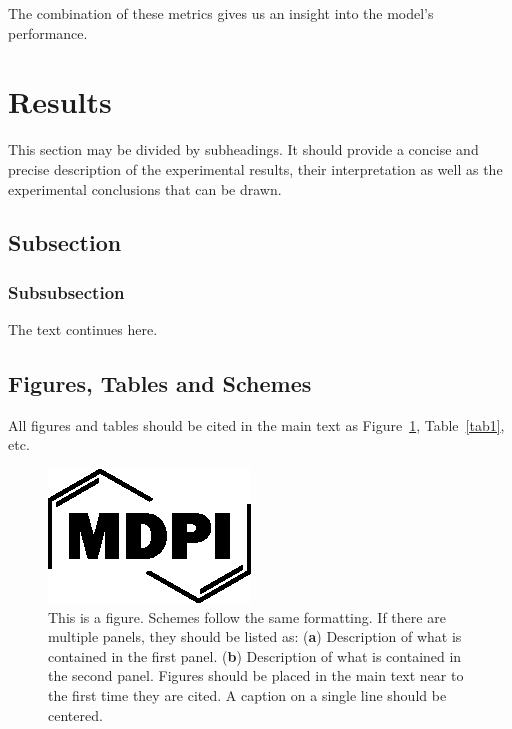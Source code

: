 \documentclass[futureinternet,article,submit,pdftex,moreauthors]{Definitions/mdpi}
\begin{document}
The combination of these metrics gives us an insight into the model's performance. 

\section{Results}

This section may be divided by subheadings. It should provide a concise and precise description of the experimental results, their interpretation as well as the experimental conclusions that can be drawn.
\subsection{Subsection}
\subsubsection{Subsubsection}


The text continues here. 

\subsection{Figures, Tables and Schemes}

All figures and tables should be cited in the main text as Figure~\ref{fig1}, Table~\ref{tab1}, etc.

\begin{figure}[H]
\includegraphics[width=10.5 cm]{Definitions/logo-mdpi}
\caption{This is a figure. Schemes follow the same formatting. If there are multiple panels, they should be listed as: (\textbf{a}) Description of what is contained in the first panel. (\textbf{b}) Description of what is contained in the second panel. Figures should be placed in the main text near to the first time they are cited. A caption on a single line should be centered.\label{fig1}}
\end{figure}   
\unskip
\end{document}
